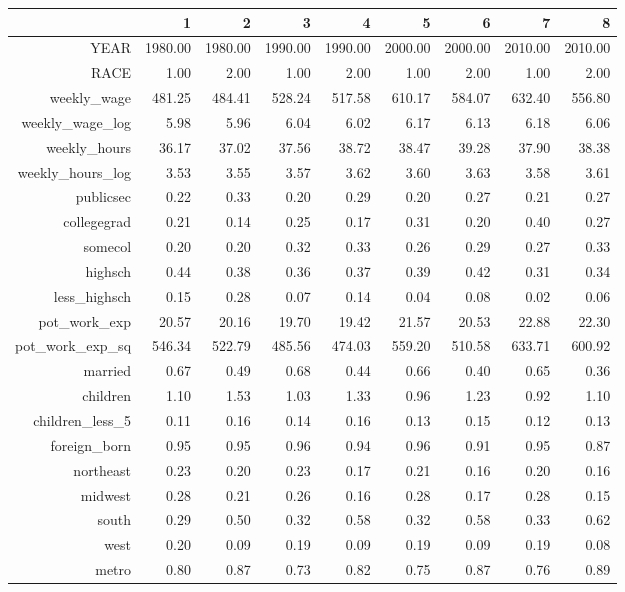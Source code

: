 \begin{table}[ht]
\centering
\begin{tabular}{rrrrrrrrr}
  \hline
 & 1 & 2 & 3 & 4 & 5 & 6 & 7 & 8 \\ 
  \hline
YEAR & 1980.00 & 1980.00 & 1990.00 & 1990.00 & 2000.00 & 2000.00 & 2010.00 & 2010.00 \\ 
  RACE & 1.00 & 2.00 & 1.00 & 2.00 & 1.00 & 2.00 & 1.00 & 2.00 \\ 
  weekly\_wage & 481.25 & 484.41 & 528.24 & 517.58 & 610.17 & 584.07 & 632.40 & 556.80 \\ 
  weekly\_wage\_log & 5.98 & 5.96 & 6.04 & 6.02 & 6.17 & 6.13 & 6.18 & 6.06 \\ 
  weekly\_hours & 36.17 & 37.02 & 37.56 & 38.72 & 38.47 & 39.28 & 37.90 & 38.38 \\ 
  weekly\_hours\_log & 3.53 & 3.55 & 3.57 & 3.62 & 3.60 & 3.63 & 3.58 & 3.61 \\ 
  publicsec & 0.22 & 0.33 & 0.20 & 0.29 & 0.20 & 0.27 & 0.21 & 0.27 \\ 
  collegegrad & 0.21 & 0.14 & 0.25 & 0.17 & 0.31 & 0.20 & 0.40 & 0.27 \\ 
  somecol & 0.20 & 0.20 & 0.32 & 0.33 & 0.26 & 0.29 & 0.27 & 0.33 \\ 
  highsch & 0.44 & 0.38 & 0.36 & 0.37 & 0.39 & 0.42 & 0.31 & 0.34 \\ 
  less\_highsch & 0.15 & 0.28 & 0.07 & 0.14 & 0.04 & 0.08 & 0.02 & 0.06 \\ 
  pot\_work\_exp & 20.57 & 20.16 & 19.70 & 19.42 & 21.57 & 20.53 & 22.88 & 22.30 \\ 
  pot\_work\_exp\_sq & 546.34 & 522.79 & 485.56 & 474.03 & 559.20 & 510.58 & 633.71 & 600.92 \\ 
  married & 0.67 & 0.49 & 0.68 & 0.44 & 0.66 & 0.40 & 0.65 & 0.36 \\ 
  children & 1.10 & 1.53 & 1.03 & 1.33 & 0.96 & 1.23 & 0.92 & 1.10 \\ 
  children\_less\_5 & 0.11 & 0.16 & 0.14 & 0.16 & 0.13 & 0.15 & 0.12 & 0.13 \\ 
  foreign\_born & 0.95 & 0.95 & 0.96 & 0.94 & 0.96 & 0.91 & 0.95 & 0.87 \\ 
  northeast & 0.23 & 0.20 & 0.23 & 0.17 & 0.21 & 0.16 & 0.20 & 0.16 \\ 
  midwest & 0.28 & 0.21 & 0.26 & 0.16 & 0.28 & 0.17 & 0.28 & 0.15 \\ 
  south & 0.29 & 0.50 & 0.32 & 0.58 & 0.32 & 0.58 & 0.33 & 0.62 \\ 
  west & 0.20 & 0.09 & 0.19 & 0.09 & 0.19 & 0.09 & 0.19 & 0.08 \\ 
  metro & 0.80 & 0.87 & 0.73 & 0.82 & 0.75 & 0.87 & 0.76 & 0.89 \\ 
   \hline
\end{tabular}
\end{table}
